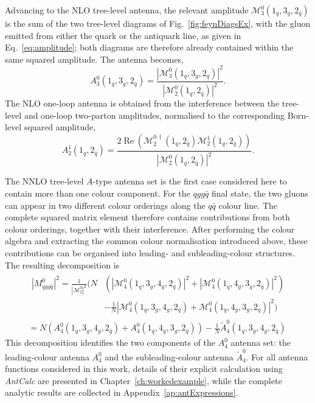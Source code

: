 Advancing to the NLO tree-level antenna, the relevant amplitude
$\mathcal M_3^0(1_q,3_g,2_{\bar q})$ is the sum of the two tree-level diagrams
of Fig.~\ref{fig:feynDiagsEx}, with the gluon emitted from either the quark or
the antiquark line, as given in Eq.~\eqref{eq:amplitude}; both diagrams are
therefore already contained within the same squared amplitude. The antenna
becomes,
\begin{equation}
    A_3^0(1_q,3_g,2_{\bar q}) =\frac{|\mathcal M_3^0(1_q,3_g,2_{\bar q})|^2}{|\mathcal M_2^0(1_q,2_{\bar q})|^2}.
\end{equation}
The NLO one-loop antenna is obtained from the interference between the
tree-level and one-loop two-parton amplitudes, normalised to the corresponding
Born-level squared amplitude,
\begin{equation}\label{eq:A21Amp}
    A_2^1(1_q,2_{\bar q}) = \frac{2\operatorname{Re}\!\left(\mathcal M_2^{0\,\dagger}(1_q,2_{\bar q})\mathcal M_2^1(1_q,2_{\bar q})\right)}{|\mathcal M_2^0(1_q,2_{\bar q})|^2}.
\end{equation}

The NNLO tree-level $A$-type antenna set is the first case considered here to
contain more than one colour component. For the $qgg\bar q$ final state, the
two gluons can appear in two different colour orderings along the $q\bar q$
colour line. The complete squared matrix element therefore contains
contributions from both colour orderings, together with their interference.
After performing the colour algebra and extracting the common colour
normalisation introduced above, these contributions can be organised into
leading- and subleading-colour structures. The resulting decomposition is
\begin{equation}\label{eq:Mqggq}
    \begin{gathered}
        \begin{aligned}
            |M_{qgg\bar q}^0|^2 = \frac1{|\mathcal M_2^0|^2}\Bigg(N&\left(|\mathcal M_4^0(1_q,3_g,4_g,2_{\bar q})|^2+|\mathcal M_4^0(1_q,4_g,3_g,2_{\bar q})|^2\right)\\
                                                                               &-\frac1N\left|\mathcal M_4^0(1_q,3_g,4_g,2_{\bar q})+\mathcal M_4^0(1_q,4_g,3_g,2_{\bar q})\right|^2\Bigg)
        \end{aligned}\\
        = N\!\left(A_4^0(1_q,3_g,4_g,2_{\bar q})+A_4^0(1_q,4_g,3_g,2_{\bar q})\right)-\frac1N\tilde A_4^0(1_q,3_g,4_g,2_{\bar q})
    \end{gathered}
\end{equation}
This decomposition identifies the two components of the $A_4^0$ antenna set:
the leading-colour antenna $A_4^0$ and the subleading-colour antenna
$\tilde A_4^0$. For all antenna functions considered in this work, details of
their explicit calculation using \textit{AntCalc} are presented in
Chapter~\ref{ch:workedexample}, while the complete analytic results are
collected in Appendix~\ref{ap:antExpressions}.

